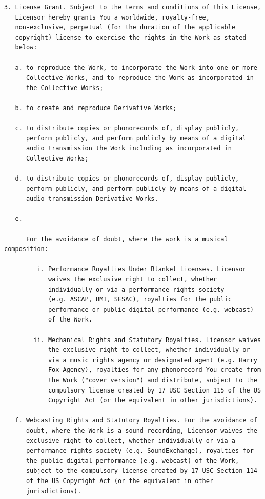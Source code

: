\begin{verbatim}
3. License Grant. Subject to the terms and conditions of this License,
   Licensor hereby grants You a worldwide, royalty-free,
   non-exclusive, perpetual (for the duration of the applicable
   copyright) license to exercise the rights in the Work as stated
   below:

   a. to reproduce the Work, to incorporate the Work into one or more
      Collective Works, and to reproduce the Work as incorporated in
      the Collective Works;

   b. to create and reproduce Derivative Works;

   c. to distribute copies or phonorecords of, display publicly,
      perform publicly, and perform publicly by means of a digital
      audio transmission the Work including as incorporated in
      Collective Works;

   d. to distribute copies or phonorecords of, display publicly,
      perform publicly, and perform publicly by means of a digital
      audio transmission Derivative Works.

   e.

      For the avoidance of doubt, where the work is a musical composition:

         i. Performance Royalties Under Blanket Licenses. Licensor
            waives the exclusive right to collect, whether
            individually or via a performance rights society
            (e.g. ASCAP, BMI, SESAC), royalties for the public
            performance or public digital performance (e.g. webcast)
            of the Work.

        ii. Mechanical Rights and Statutory Royalties. Licensor waives
            the exclusive right to collect, whether individually or
            via a music rights agency or designated agent (e.g. Harry
            Fox Agency), royalties for any phonorecord You create from
            the Work ("cover version") and distribute, subject to the
            compulsory license created by 17 USC Section 115 of the US
            Copyright Act (or the equivalent in other jurisdictions).

   f. Webcasting Rights and Statutory Royalties. For the avoidance of
      doubt, where the Work is a sound recording, Licensor waives the
      exclusive right to collect, whether individually or via a
      performance-rights society (e.g. SoundExchange), royalties for
      the public digital performance (e.g. webcast) of the Work,
      subject to the compulsory license created by 17 USC Section 114
      of the US Copyright Act (or the equivalent in other
      jurisdictions).


\end{verbatim}
